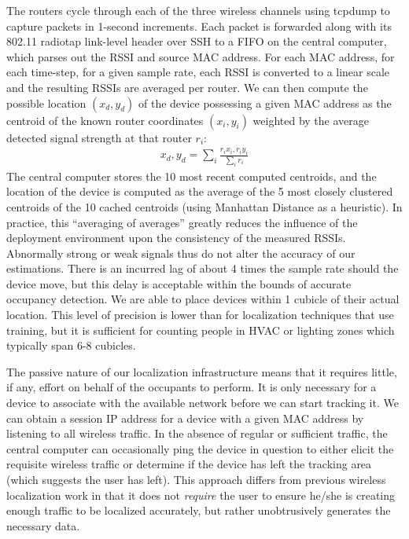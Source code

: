 The routers cycle through each of the three wireless channels using tcpdump to capture packets in 1-second increments. Each packet is forwarded along with its 802.11 radiotap link-level header over SSH to a FIFO on the central computer, which parses out the RSSI and source MAC address. For each MAC address, for each time-step, for a given sample rate, each RSSI is converted to a linear scale and the resulting RSSIs are averaged per router. We can then compute the possible location $(x_d,y_d)$ of the device possessing a given MAC address as the centroid of the known router coordinates $(x_i, y_i)$ weighted by the average detected signal strength at that router $r_i$:
\begin{equation}
\begin{split}
x_d, y_d = \displaystyle\sum_{i} \frac{r_ix_i, r_iy_i}{\displaystyle\sum_i r_i}
\end{split}
\end{equation}
The central computer stores the 10 most recent computed centroids, and the location of the device is computed as the average of the 5 most closely clustered centroids of the 10 cached centroids (using Manhattan Distance as a heuristic). In practice, this ``averaging of averages'' greatly reduces the influence of the deployment environment upon the consistency of the measured RSSIs. Abnormally strong or weak signals thus do not alter the accuracy of our estimations. There is an incurred lag of about 4 times the sample rate should the device move, but this delay is acceptable within the bounds of accurate occupancy detection. We are able to place devices within 1 cubicle of their actual location. This level of precision is lower than for localization techniques that use training, but it is sufficient for counting people in HVAC or lighting zones which typically span 6-8 cubicles.

The passive nature of our localization infrastructure means that it requires little, if any, effort on behalf of the occupants to perform. It is only necessary for a device to associate with the available network before we can start tracking it. We can obtain a session IP address for a device with a given MAC address by listening to all wireless traffic. In the absence of regular or sufficient traffic, the central computer can occasionally ping the device in question to either elicit the requisite wireless traffic or determine if the device has left the tracking area (which suggests the user has left). This approach differs from previous wireless localization work in that it does not \emph{require} the user to ensure he/she is creating enough traffic to be localized accurately, but rather unobtrusively generates the necessary data. 


